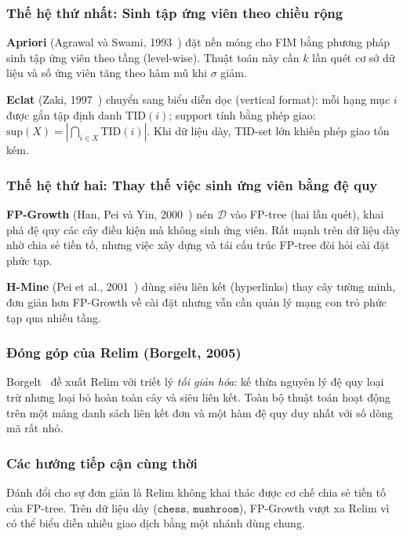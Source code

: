 \documentclass[12pt,a4paper]{report}
\begin{document}
\subsubsection{Thế hệ thứ nhất: Sinh tập ứng viên theo chiều rộng}

\textbf{Apriori} (Agrawal và Swami, 1993~\cite{apriori1993}) đặt nền móng cho FIM
bằng phương pháp sinh tập ứng viên theo tầng (level-wise). Thuật toán này cần $k$
lần quét cơ sở dữ liệu và số ứng viên tăng theo hàm mũ khi $\sigma$ giảm. 

\noindent
\textbf{Eclat} (Zaki, 1997~\cite{eclat1997}) chuyển sang biểu diễn dọc (vertical
format): mỗi hạng mục $i$ được gắn tập định danh $\mathrm{TID}(i)$; support tính
bằng phép giao: $\mathrm{sup}(X) = |\bigcap_{i \in X} \mathrm{TID}(i)|$. Khi dữ
liệu dày, TID-set lớn khiến phép giao tốn kém.
 
\subsubsection{Thế hệ thứ hai: Thay thế việc sinh ứng viên bằng đệ quy}
 
\textbf{FP-Growth} (Han, Pei và Yin, 2000~\cite{fpgrowth2000}) nén $\mathcal{D}$
vào FP-tree (hai lần quét), khai phá đệ quy các cây điều kiện mà không sinh ứng
viên. Rất mạnh trên dữ liệu dày nhờ chia sẻ tiền tố, nhưng việc xây dựng và tái
cấu trúc FP-tree đòi hỏi cài đặt phức tạp.

\noindent
\textbf{H-Mine} (Pei et al., 2001~\cite{hmine2001}) dùng siêu liên kết (hyperlinks)
thay cây tường minh, đơn giản hơn FP-Growth về cài đặt nhưng vẫn cần quản lý mạng
con trỏ phức tạp qua nhiều tầng.
 
\subsubsection{Đóng góp của Relim (Borgelt, 2005)}
 
Borgelt~\cite{borgelt2005} đề xuất Relim với triết lý \textit{tối giản hóa}: kế
thừa nguyên lý đệ quy loại trừ nhưng loại bỏ hoàn toàn cây và siêu liên kết. Toàn
bộ thuật toán hoạt động trên một mảng danh sách liên kết đơn và một hàm đệ quy
duy nhất với số dòng mã rất nhỏ.
 
\subsubsection{Các hướng tiếp cận cùng thời}
 
Đánh đổi cho sự đơn giản là Relim không khai thác được cơ chế chia sẻ tiền tố của
FP-tree. Trên dữ liệu dày ($\mathtt{chess}$, $\mathtt{mushroom}$), FP-Growth vượt
xa Relim vì có thể biểu diễn nhiều giao dịch bằng một nhánh dùng chung.
\end{document}
